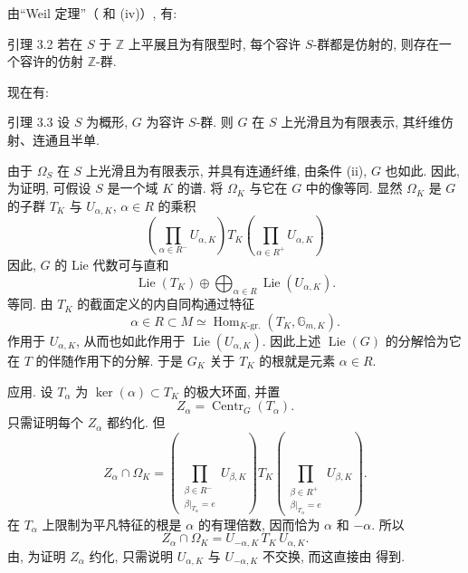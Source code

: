 由“Weil 定理”（ 和 (iv)）, 有:

\begin{sgastatement}{引理 3.2}
若在 \(S\) 于 \(\mathbb Z\) 上平展且为有限型时, 每个容许 \(S\)-群都是仿射的, 则存在一个容许的仿射 \(\mathbb Z\)-群.
\end{sgastatement}

现在有:

\begin{sgastatement}{引理 3.3}
设 \(S\) 为概形, \(G\) 为容许 \(S\)-群. 则 \(G\) 在 \(S\) 上光滑且为有限表示, 其纤维仿射、连通且半单.
\end{sgastatement}

由于 \(\Omega_S\) 在 \(S\) 上光滑且为有限表示, 并具有连通纤维, 由条件 (ii), \(G\) 也如此. 因此, 为证明, 可假设 \(S\) 是一个域 \(K\) 的谱. 将 \(\Omega_K\) 与它在 \(G\) 中的像等同. 显然 \(\Omega_K\) 是 \(G\) 的子群 \(T_K\) 与 \(U_{\alpha,K}\), \(\alpha\in R\) 的乘积
\[
 \left(\prod_{\alpha\in R^-}U_{\alpha,K}\right)
 T_K
 \left(\prod_{\alpha\in R^+}U_{\alpha,K}\right)
\]
因此, \(G\) 的 Lie 代数可与直和
\[
 \operatorname{Lie}(T_K)
 \oplus
 \bigoplus_{\alpha\in R}\operatorname{Lie}(U_{\alpha,K}).
\]
等同. 由 \(T_K\) 的截面定义的内自同构通过特征
\[
 \alpha\in R\subset M
 \simeq\operatorname{Hom}_{K\text{-gr.}}(T_K,\mathbb G_{m,K}).
\]
作用于 \(U_{\alpha,K}\), 从而也如此作用于 \(\operatorname{Lie}(U_{\alpha,K})\). 因此上述 \(\operatorname{Lie}(G)\) 的分解恰为它在 \(T\) 的伴随作用下的分解. 于是 \(G_K\) 关于 \(T_K\) 的根就是元素 \(\alpha\in R\).

应用. 设 \(T_\alpha\) 为 \(\ker(\alpha)\subset T_K\) 的极大环面, 并置
\[
 Z_\alpha=\operatorname{Centr}_G(T_\alpha).
\]
只需证明每个 \(Z_\alpha\) 都约化. 但
\[
 Z_\alpha\cap\Omega_K
 =
 \left(
 \prod_{\substack{\beta\in R^-\\\beta|_{T_\alpha}=e}}
 U_{\beta,K}
 \right)
 T_K
 \left(
 \prod_{\substack{\beta\in R^+\\\beta|_{T_\alpha}=e}}
 U_{\beta,K}
 \right).
\]
在 \(T_\alpha\) 上限制为平凡特征的根是 \(\alpha\) 的有理倍数, 因而恰为 \(\alpha\) 和 \(-\alpha\). 所以
\[
 Z_\alpha\cap\Omega_K
 =U_{-\alpha,K}\,T_K\,U_{\alpha,K}.
\]
由, 为证明 \(Z_\alpha\) 约化, 只需说明 \(U_{\alpha,K}\) 与 \(U_{-\alpha,K}\) 不交换, 而这直接由 得到.

